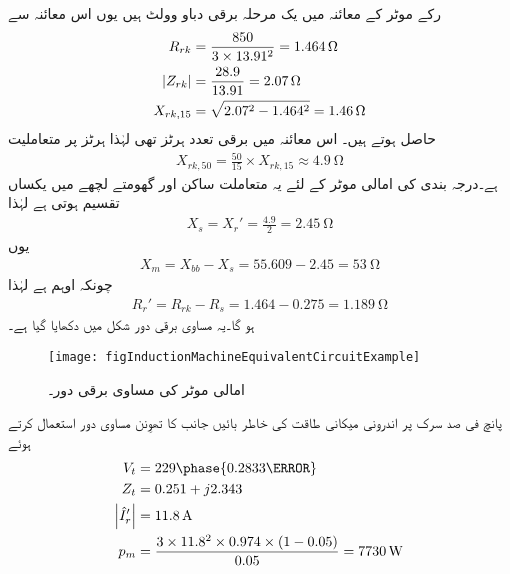 رکے موٹر کے معائنہ میں یک مرحلہ برقی دباو  وولٹ ہیں یوں اس معائنہ سے
\begin{align*}
R_{rk}&=\frac{850}{3 \times 13.91^2}=\SI{1.464}{\ohm}\\
\abs{Z_{rk}}&=\frac{28.9}{13.91}=\SI{2.07}{\ohm}\\
X_{rk, 15}&=\sqrt{2.07^2-1.464^2}=\SI{1.46}{\ohm}
\end{align*}
حاصل ہوتے ہیں۔ اس معائنہ میں برقی تعدد  ہرٹز تھی لہٰذا  ہرٹز پر متعاملیت
\begin{align*}
X_{rk,50}=\frac{50}{15} \times X_{rk,15} \approx \SI{4.9}{\ohm}
\end{align*}
ہے۔درجہ بندی  کی امالی موٹر کے لئے یہ متعاملت ساکن اور گھومتے لچھے میں یکساں تقسیم ہوتی ہے لہٰذا
\begin{align*}
X_s=X_r'=\frac{4.9}{2}=\SI{2.45}{\ohm}
\end{align*}
یوں
\begin{align*}
X_m=X_{bb}-X_s=55.609-2.45=\SI{53}{\ohm}
\end{align*}
چونکہ   اوہم ہے  لہٰذا
\begin{align*}
R_r'=R_{rk}-R_s=1.464-0.275=\SI{1.189}{\ohm}
\end{align*}
ہو گا۔یہ مساوی برقی دور شکل  میں دکھایا گیا ہے۔
\begin{figure}
\centering
\texttt{[image: figInductionMachineEquivalentCircuitExample]}
\caption{امالی موٹر کی مساوی برقی دور۔}
\label{شکل_امالی_موٹر_مثال_کا_دور}
\end{figure}

پانچ فی صد سرک پر اندرونی میکانی طاقت کی خاطر بائیں جانب کا تھوِنن مساوی دور استعمال کرتے ہوئے 
\begin{align*}
V_t&=229 \phase{0.2833 \degree}\\
Z_t&=0.251+j2.343\\
\abs{\hat{I}_r'}&=\SI{11.8}{\ampere}\\
p_m&=\frac{3 \times 11.8^2 \times 0.974 \times (1-0.05)}{0.05}=\SI{7730}{\watt}
\end{align*}
